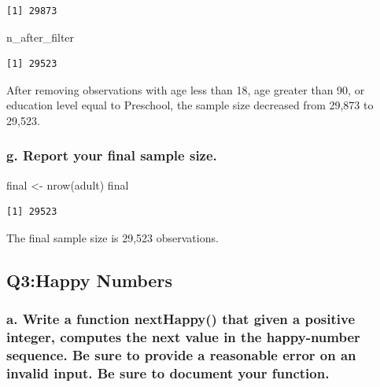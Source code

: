 \documentclass[
  letterpaper,
  DIV=11,
  numbers=noendperiod]{scrartcl}
\newenvironment{Shaded}{\begin{snugshade}}{\end{snugshade}}
\newcommand{\FunctionTok}[1]{\textcolor[rgb]{0.28,0.35,0.67}{#1}}
\newcommand{\NormalTok}[1]{\textcolor[rgb]{0.00,0.23,0.31}{#1}}
\newcommand{\OtherTok}[1]{\textcolor[rgb]{0.00,0.23,0.31}{#1}}
\begin{document}
\begin{verbatim}
[1] 29873
\end{verbatim}

\begin{Shaded}
\begin{Highlighting}[]
\NormalTok{n\_after\_filter}
\end{Highlighting}
\end{Shaded}

\begin{verbatim}
[1] 29523
\end{verbatim}

After removing observations with age less than 18, age greater than 90,
or education level equal to Preschool, the sample size decreased from
29,873 to 29,523.

\subsubsection{g. Report your final sample
size.}\label{g.-report-your-final-sample-size.}

\begin{Shaded}
\begin{Highlighting}[]
\NormalTok{final }\OtherTok{\textless{}{-}} \FunctionTok{nrow}\NormalTok{(adult)}
\NormalTok{final}
\end{Highlighting}
\end{Shaded}

\begin{verbatim}
[1] 29523
\end{verbatim}

The final sample size is 29,523 observations.

\subsection{Q3:Happy Numbers}\label{q3happy-numbers}

\subsubsection{a. Write a function nextHappy() that given a positive
integer, computes the next value in the happy-number sequence. Be sure
to provide a reasonable error on an invalid input. Be sure to document
your
function.}\label{a.-write-a-function-nexthappy-that-given-a-positive-integer-computes-the-next-value-in-the-happy-number-sequence.-be-sure-to-provide-a-reasonable-error-on-an-invalid-input.-be-sure-to-document-your-function.}
\end{document}
